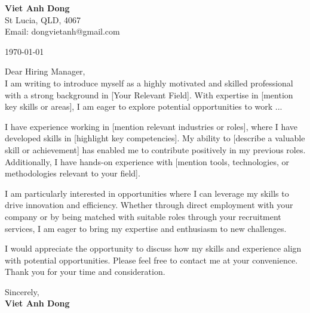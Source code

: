 \documentclass[12pt]{article}
\begin{document}
\begin{flushright}
\textbf{Viet Anh Dong} \\
St Lucia, QLD, 4067 \\
Email: dongvietanh@gmail.com \\
\end{flushright}

\begin{flushleft}
\today
\end{flushleft}


Dear Hiring Manager,\\

I am writing to introduce myself as a highly motivated and skilled professional with a strong background in [Your Relevant Field]. With expertise in [mention key skills or areas], I am eager to explore potential opportunities to work ...

I have experience working in [mention relevant industries or roles], where I have developed skills in [highlight key competencies]. My ability to [describe a valuable skill or achievement] has enabled me to contribute positively in my previous roles. Additionally, I have hands-on experience with [mention tools, technologies, or methodologies relevant to your field].

I am particularly interested in opportunities where I can leverage my skills to drive innovation and efficiency. Whether through direct employment with your company or by being matched with suitable roles through your recruitment services, I am eager to bring my expertise and enthusiasm to new challenges.

I would appreciate the opportunity to discuss how my skills and experience align with potential opportunities. Please feel free to contact me at your convenience. Thank you for your time and consideration.


Sincerely,\\

\textbf{Viet Anh Dong}
\end{document}
